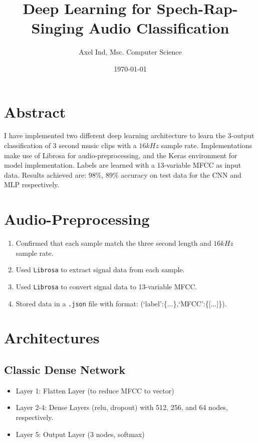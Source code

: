 \documentclass[12pt]{article}
\title{Deep Learning for Spech-Rap-Singing Audio Classification}
\date{\today}
\author{Axel Ind, Msc. Computer Science}
\begin{document}
\maketitle

\section*{Abstract}
I have implemented two different deep learning architecture to learn the 3-output classification of 3 second music clips with a $16kHz$ sample rate. Implementations make use of Librosa for audio-preprocessing, and the Keras environment for model implementation. Labels are learned with a 13-variable MFCC as input data. Results achieved are: 98\%, 89\% accuracy on test data for the CNN and MLP respectively.

\section{Audio-Preprocessing}
\begin{enumerate}
\item Confirmed that each sample match the three second length and $16kHz$ sample rate.
\item Used \texttt{Librosa} to extract signal data from each sample.
\item Used \texttt{Librosa} to convert signal data to 13-variable MFCC.
\item Stored data in a \texttt{.json} file with format: (`label':\{...\},`MFCC':\{[...]\}).
\end{enumerate}
\section{Architectures}
\subsection{Classic Dense Network}
\begin{itemize}
\item Layer 1: Flatten Layer (to reduce MFCC to vector)
\item Layer 2-4: Dense Layers (relu, dropout) with 512, 256, and 64 nodes, respectively. 
\item Layer 5: Output Layer (3 nodes, softmax)
\end{itemize}
\end{document}
